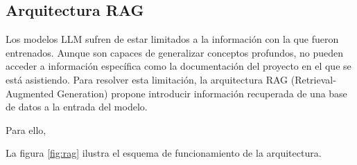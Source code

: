\subsection{Arquitectura RAG}
Los modelos LLM sufren de estar limitados a la información con la que fueron entrenados. Aunque son capaces de generalizar conceptos profundos, no pueden acceder a información específica como la documentación del proyecto en el que se está asistiendo. Para resolver esta limitación, la arquitectura RAG (Retrieval-Augmented Generation) propone introducir información recuperada de una base de datos a la entrada del modelo. 

Para ello,  

La figura \ref{fig:rag} ilustra el esquema de funcionamiento de la arquitectura.  
